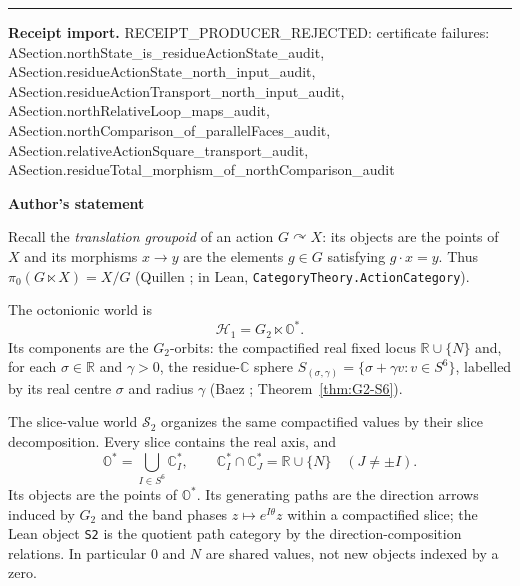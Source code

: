 \documentclass[11pt]{article}
\newcommand{\OO}{\mathbb{O}}
\newcommand{\CC}{\mathbb{C}}
\newcommand{\RR}{\mathbb{R}}
\providecommand{\Gtwo}{G_2}
\theoremstyle{plain}
\theoremstyle{definition}
\theoremstyle{remark}
\begin{document}
\begin{tcolorbox}[provenancecard,title={38. Definition - The section's slice data and equivariance},title after break={38. Definition - The section's slice data and equivariance (continued)}]
\medskip\hrule\medskip
\textbf{Receipt import.} \textcolor{KgtRed}{RECEIPT\_PRODUCER\_REJECTED: certificate failures: ASection.northState\_is\_residueActionState\_audit, ASection.residueActionState\_north\_input\_audit, ASection.residueActionTransport\_north\_input\_audit, ASection.northRelativeLoop\_maps\_audit, ASection.northComparison\_of\_parallelFaces\_audit, ASection.relativeActionSquare\_transport\_audit, ASection.residueTotal\_morphism\_of\_northComparison\_audit}
\end{tcolorbox}
\medskip
\begin{tcolorbox}[provenancecard,title={39. Definition - The octonionic and slice-value worlds},title after break={39. Definition - The octonionic and slice-value worlds (continued)}]
\textbf{Author's statement}\par
Recall the \emph{translation groupoid} of an action $G\curvearrowright X$: its objects are the
points of $X$ and its morphisms $x\to y$ are the elements $g\in G$ satisfying $g\cdot x=y$.
Thus $\pi_0(G\ltimes X)=X/G$ (Quillen \cite[\S1]{Quillen73}; in Lean,
\texttt{CategoryTheory.ActionCategory}).

The octonionic world is
\[
  \mathcal H_1=\Gtwo\ltimes\OO^{*}.
\]
Its components are the $\Gtwo$-orbits: the compactified real fixed locus $\RR\cup\{N\}$ and,
for each $\sigma\in\RR$ and $\gamma>0$, the residue-$\CC$ sphere
$S_{(\sigma,\gamma)}=\{\sigma+\gamma v:v\in S^6\}$, labelled by its real centre $\sigma$ and
radius $\gamma$ (Baez \cite{Baez02}; Theorem~\ref{thm:G2-S6}).

The slice-value world $\mathcal S_2$ organizes the same compactified values by their slice
decomposition. Every slice contains the real axis, and
\[
  \OO^{*}=\bigcup_{I\in S^6}\CC_I^{*},\qquad
  \CC_I^{*}\cap\CC_J^{*}=\RR\cup\{N\}\quad(J\neq\pm I).
\]
Its objects are the points of $\OO^{*}$. Its generating paths are the direction arrows induced
by $\Gtwo$ and the band phases $z\mapsto e^{I\theta}z$ within a compactified slice; the Lean
object \texttt{S2} is the quotient path category by the direction-composition relations. In
particular $0$ and $N$ are shared values, not new objects indexed by a zero.


\end{tcolorbox}
\end{document}
